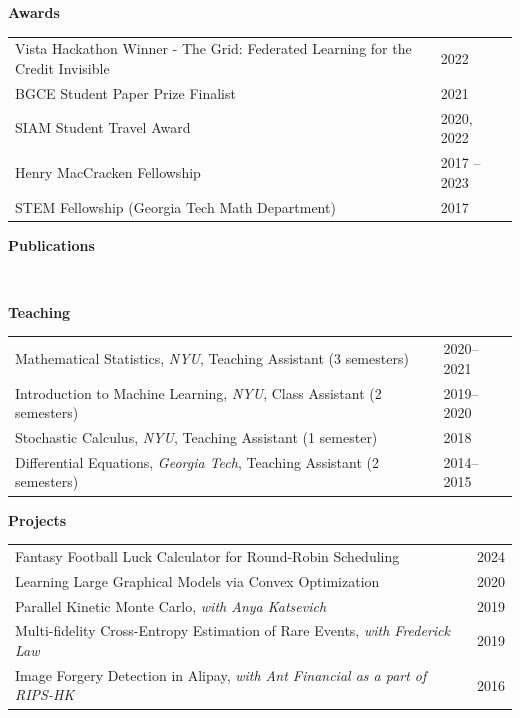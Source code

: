 \documentclass{article}
\begin{document}
{\Large\bf Awards} \hrulefill \\

\begin{tabular}{p{4.8in}p{2in}}
    Vista Hackathon Winner - The Grid: Federated Learning for the Credit Invisible & 2022\\
    BGCE Student Paper Prize Finalist & 2021 \\
    SIAM Student Travel Award & 2020, 2022\\
    Henry MacCracken Fellowship & 2017 -- 2023 \\
    STEM Fellowship (Georgia Tech Math Department) & 2017 
\end{tabular}

\vspace{0.25in}

{\Large\bf Publications} \hrulefill \\
\vspace{-0.6in}
\begin{minipage}{0.03\textwidth}
~\\
\end{minipage}
\begin{minipage}{0.96\textwidth}


\nocite{*}
\end{minipage}

\vspace{1in}


{\Large\bf Teaching} \hrulefill \\

\begin{tabular}{p{4.8in}p{2in}}
    Mathematical Statistics, \emph{NYU}, Teaching Assistant (3 semesters) & 2020--2021\\
    Introduction to Machine Learning, \emph{NYU}, Class Assistant (2 semesters) & 2019--2020 \\
    Stochastic Calculus, \emph{NYU}, Teaching Assistant (1 semester) & 2018\\
    Differential Equations, \emph{Georgia Tech}, Teaching Assistant (2 semesters) & 2014--2015
\end{tabular}

\vspace{0.25in}

{\Large\bf Projects} \hrulefill \\

\begin{tabular}{p{4.8in}p{2in}}
    Fantasy Football Luck Calculator for Round-Robin Scheduling & 2024\\
    Learning Large Graphical Models via Convex Optimization & 2020 \\
    Parallel Kinetic Monte Carlo, \emph{with Anya Katsevich} & 2019\\
    Multi-fidelity Cross-Entropy Estimation of Rare Events, \emph{with Frederick Law} & 2019\\
    Image Forgery Detection in Alipay, \emph{with Ant Financial as a part of RIPS-HK} & 2016 
\end{tabular}
\end{document}
